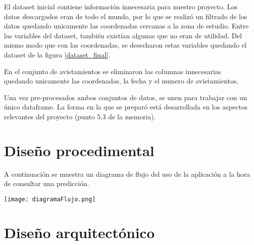 El dataset inicial contiene información innecesaria para nuestro proyecto. Los datos descargados eran de todo el mundo, por lo que se realizó un filtrado de los datos quedando unicamente las coordenadas cercanas a la zona de estudio. Entre las variables del dataset, también existían algunas que no eran de utilidad. Del mismo modo que con las coordenadas, se desecharon estas variables quedando el dataset de la figura \ref{dataset_final}.

\label{dataset_final}

En el conjunto de avistamientos se eliminaron las columnas innecesarias quedando unicamente las coordenadas, la fecha y el numero de avistamientos.

Una vez pre-procesados ambos conjuntos de datos, se unen para trabajar con un único dataframe. La forma en la que se preparó está desarrollada en los aspectos relevantes del proyecto (punto 5.3 de la memoria).

\section{Diseño procedimental}

A continuación se muestra un diagrama de flujo del uso de la aplicación a la hora de consultar una predicción.

\begin{center}
\texttt{[image: diagramaFlujo.png]}
\end{center}

\section{Diseño arquitectónico}


